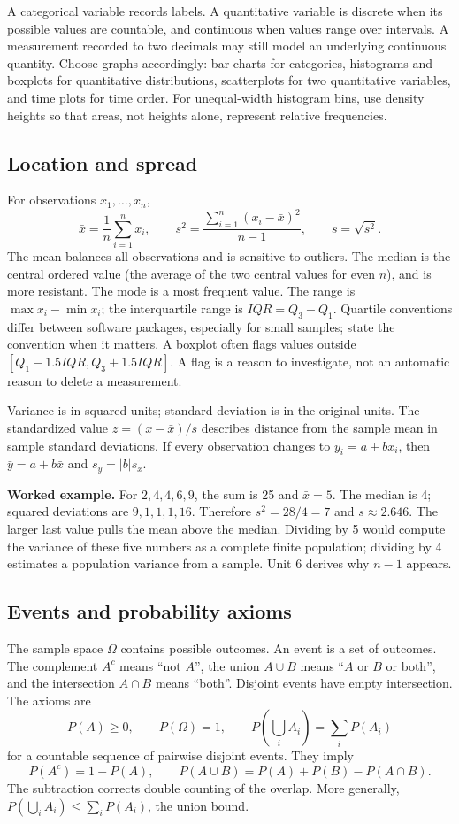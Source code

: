 A categorical variable records labels. A quantitative variable is discrete
when its possible values are countable, and continuous when values range
over intervals. A measurement recorded to two decimals may still model
an underlying continuous quantity. Choose graphs accordingly: bar charts
for categories, histograms and boxplots for quantitative distributions,
scatterplots for two quantitative variables, and time plots for time order.
For unequal-width histogram bins, use density heights so that areas, not
heights alone, represent relative frequencies.

\subsection{Location and spread}
For observations $x_1,\ldots,x_n$,
\[
\bar x=\frac1n\sum_{i=1}^n x_i,\qquad
s^2=\frac{\sum_{i=1}^n(x_i-\bar x)^2}{n-1},\qquad s=\sqrt{s^2}.
\]
The mean balances all observations and is sensitive to outliers. The median
is the central ordered value (the average of the two central values for even
$n$), and is more resistant. The mode is a most frequent value. The range is
$\max x_i-\min x_i$; the interquartile range is $IQR=Q_3-Q_1$.
Quartile conventions differ between software packages, especially for small
samples; state the convention when it matters. A boxplot often flags values
outside $[Q_1-1.5IQR,Q_3+1.5IQR]$. A flag is a reason to investigate, not an
automatic reason to delete a measurement.

Variance is in squared units; standard deviation is in the original units.
The standardized value $z=(x-\bar x)/s$ describes distance from the sample
mean in sample standard deviations. If every observation changes to
$y_i=a+bx_i$, then $\bar y=a+b\bar x$ and $s_y=|b|s_x$.

\textbf{Worked example.} For $2,4,4,6,9$, the sum is 25 and $\bar x=5$.
The median is 4; squared deviations are $9,1,1,1,16$. Therefore
$s^2=28/4=7$ and $s\approx2.646$. The larger last value pulls the mean above
the median. Dividing by 5 would compute the variance of these five numbers
as a complete finite population; dividing by 4 estimates a population
variance from a sample. Unit 6 derives why $n-1$ appears.

\subsection{Events and probability axioms}
The sample space $\Omega$ contains possible outcomes. An event is a set of
outcomes. The complement $A^c$ means ``not $A$'', the union $A\cup B$ means
``$A$ or $B$ or both'', and the intersection $A\cap B$ means ``both''.
Disjoint events have empty intersection. The axioms are
\[
P(A)\geq0,\qquad P(\Omega)=1,\qquad
P\!\left(\bigcup_i A_i\right)=\sum_iP(A_i)
\]
for a countable sequence of pairwise disjoint events. They imply
\[
P(A^c)=1-P(A),\qquad
P(A\cup B)=P(A)+P(B)-P(A\cap B).
\]
The subtraction corrects double counting of the overlap. More generally,
$P(\bigcup_i A_i)\leq\sum_iP(A_i)$, the union bound.


